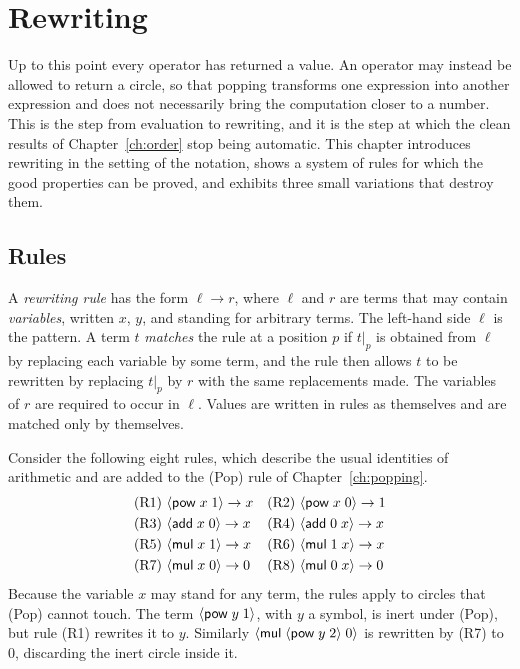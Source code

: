 \chapter{Rewriting}
\label{ch:rewriting}

Up to this point every operator has returned a value. An operator may instead be allowed to return a circle, so that popping transforms one expression into another expression and does not necessarily bring the computation closer to a number. This is the step from evaluation to rewriting, and it is the step at which the clean results of Chapter~\ref{ch:order} stop being automatic. This chapter introduces rewriting in the setting of the notation, shows a system of rules for which the good properties can be proved, and exhibits three small variations that destroy them.

\section{Rules}

A \emph{rewriting rule} has the form $\ell\to r$, where $\ell$ and $r$ are terms that may contain \emph{variables}, written $x$, $y$, and standing for arbitrary terms. The left-hand side $\ell$ is the pattern. A term $t$ \emph{matches} the rule at a position $p$ if $t|_p$ is obtained from $\ell$ by replacing each variable by some term, and the rule then allows $t$ to be rewritten by replacing $t|_p$ by $r$ with the same replacements made. The variables of $r$ are required to occur in $\ell$. Values are written in rules as themselves and are matched only by themselves.

Consider the following eight rules, which describe the usual identities of arithmetic and are added to the (Pop) rule of Chapter~\ref{ch:popping}.
\begin{align*}
&\text{(R1)}\ \cir{\op{pow}\; x\; 1}\to x &&\text{(R2)}\ \cir{\op{pow}\; x\; 0}\to 1\\
&\text{(R3)}\ \cir{\op{add}\; x\; 0}\to x &&\text{(R4)}\ \cir{\op{add}\; 0\; x}\to x\\
&\text{(R5)}\ \cir{\op{mul}\; x\; 1}\to x &&\text{(R6)}\ \cir{\op{mul}\; 1\; x}\to x\\
&\text{(R7)}\ \cir{\op{mul}\; x\; 0}\to 0 &&\text{(R8)}\ \cir{\op{mul}\; 0\; x}\to 0
\end{align*}
Because the variable $x$ may stand for any term, the rules apply to circles that (Pop) cannot touch. The term $\langle \mathsf{pow}\; y\; 1\rangle$, with $y$ a symbol, is inert under (Pop), but rule (R1) rewrites it to $y$. Similarly $\langle \mathsf{mul}\; \langle \mathsf{pow}\; y\; 2\rangle\; 0\rangle$ is rewritten by (R7) to $0$, discarding the inert circle inside it.

